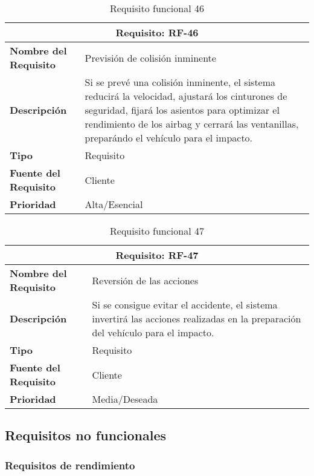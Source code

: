 \begin{table}[H]
\begin{center}
\begin{tabular}{p{} p{7cm}}
\multicolumn{2}{c}{\textbf{Requisito: RF-46} } \\
\hline \hline
\textbf{Nombre del Requisito} & Previsión de colisión inminente\\
\hline
\textbf{Descripción} &  Si se prevé una colisión inminente, el sistema reducirá la velocidad, ajustará los cinturones de seguridad, fijará los asientos para optimizar el rendimiento de los airbag y cerrará las ventanillas, preparándo el vehículo para el impacto.\\
\hline
\textbf{Tipo} & Requisito  \\
\hline
\textbf{Fuente del Requisito} & Cliente  \\
\hline
\textbf{Prioridad} & Alta/Esencial \\ \hline
\end{tabular}
\caption{Requisito funcional 46}
\label{tab:RF-46}
\end{center}
\end{table}

\begin{table}[H]
\begin{center}
\begin{tabular}{p{} p{7cm}}
\multicolumn{2}{c}{\textbf{Requisito: RF-47} } \\
\hline \hline
\textbf{Nombre del Requisito} & Reversión de las acciones\\
\hline
\textbf{Descripción} &  Si se consigue evitar el accidente, el sistema invertirá las acciones realizadas en la preparación del vehículo para el impacto.\\
\hline
\textbf{Tipo} & Requisito  \\
\hline
\textbf{Fuente del Requisito} & Cliente  \\
\hline
\textbf{Prioridad} & Media/Deseada \\ \hline
\end{tabular}
\caption{Requisito funcional 47}
\label{tab:RF-47}
\end{center}
\end{table}


\subsection{Requisitos no funcionales}

\subsubsection{Requisitos de rendimiento}


